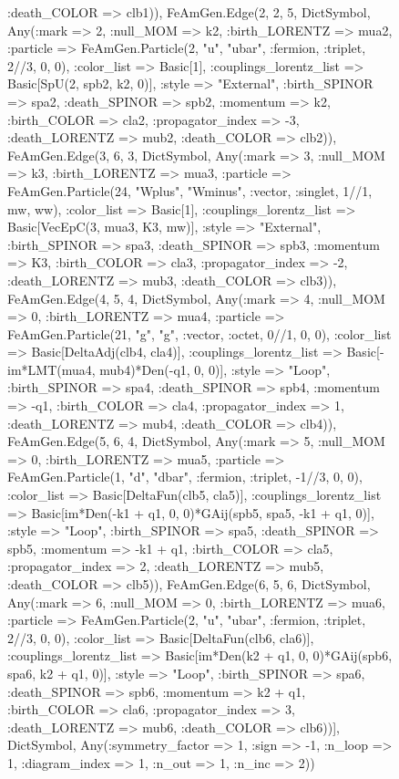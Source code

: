 \documentclass{revtex4}
\begin{document}
\begin{figure}[!htb]
\begin{center}
{:death_COLOR => clb1)), FeAmGen.Edge(2, 2, 5, Dict{Symbol, Any}(:mark => 2, :null_MOM => k2, :birth_LORENTZ => mua2, :particle => FeAmGen.Particle(2, "u", "ubar", :fermion, :triplet, 2//3, 0, 0), :color_list => Basic[1], :couplings_lorentz_list => Basic[SpU(2, spb2, k2, 0)], :style => "External", :birth_SPINOR => spa2, :death_SPINOR => spb2, :momentum => k2, :birth_COLOR => cla2, :propagator_index => -3, :death_LORENTZ => mub2, :death_COLOR => clb2)), FeAmGen.Edge(3, 6, 3, Dict{Symbol, Any}(:mark => 3, :null_MOM => k3, :birth_LORENTZ => mua3, :particle => FeAmGen.Particle(24, "Wplus", "Wminus", :vector, :singlet, 1//1, mw, ww), :color_list => Basic[1], :couplings_lorentz_list => Basic[VecEpC(3, mua3, K3, mw)], :style => "External", :birth_SPINOR => spa3, :death_SPINOR => spb3, :momentum => K3, :birth_COLOR => cla3, :propagator_index => -2, :death_LORENTZ => mub3, :death_COLOR => clb3)), FeAmGen.Edge(4, 5, 4, Dict{Symbol, Any}(:mark => 4, :null_MOM => 0, :birth_LORENTZ => mua4, :particle => FeAmGen.Particle(21, "g", "g", :vector, :octet, 0//1, 0, 0), :color_list => Basic[DeltaAdj(clb4, cla4)], :couplings_lorentz_list => Basic[-im*LMT(mua4, mub4)*Den(-q1, 0, 0)], :style => "Loop", :birth_SPINOR => spa4, :death_SPINOR => spb4, :momentum => -q1, :birth_COLOR => cla4, :propagator_index => 1, :death_LORENTZ => mub4, :death_COLOR => clb4)), FeAmGen.Edge(5, 6, 4, Dict{Symbol, Any}(:mark => 5, :null_MOM => 0, :birth_LORENTZ => mua5, :particle => FeAmGen.Particle(1, "d", "dbar", :fermion, :triplet, -1//3, 0, 0), :color_list => Basic[DeltaFun(clb5, cla5)], :couplings_lorentz_list => Basic[im*Den(-k1 + q1, 0, 0)*GAij(spb5, spa5, -k1 + q1, 0)], :style => "Loop", :birth_SPINOR => spa5, :death_SPINOR => spb5, :momentum => -k1 + q1, :birth_COLOR => cla5, :propagator_index => 2, :death_LORENTZ => mub5, :death_COLOR => clb5)), FeAmGen.Edge(6, 5, 6, Dict{Symbol, Any}(:mark => 6, :null_MOM => 0, :birth_LORENTZ => mua6, :particle => FeAmGen.Particle(2, "u", "ubar", :fermion, :triplet, 2//3, 0, 0), :color_list => Basic[DeltaFun(clb6, cla6)], :couplings_lorentz_list => Basic[im*Den(k2 + q1, 0, 0)*GAij(spb6, spa6, k2 + q1, 0)], :style => "Loop", :birth_SPINOR => spa6, :death_SPINOR => spb6, :momentum => k2 + q1, :birth_COLOR => cla6, :propagator_index => 3, :death_LORENTZ => mub6, :death_COLOR => clb6))], Dict{Symbol, Any}(:symmetry_factor => 1, :sign => -1, :n_loop => 1, :diagram_index => 1, :n_out => 1, :n_inc => 2)) 
}
\end{center}
\end{figure}
\end{document}
